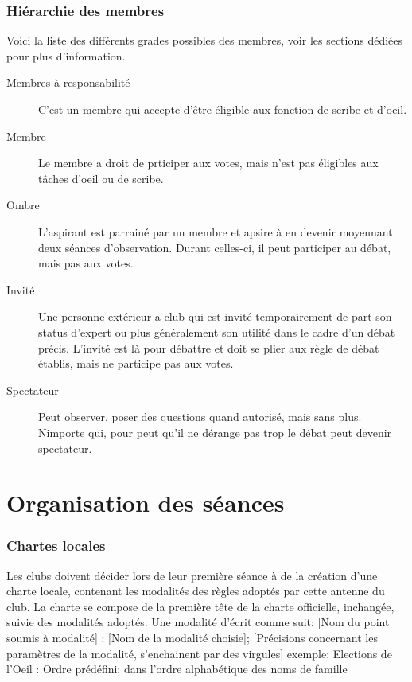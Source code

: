 \documentclass[a4paper,12pt]{article}
\begin{document}
\section{Hiérarchie des membres}
Voici la liste des différents grades possibles des membres, voir les sections dédiées pour plus d'information.
\begin{description}
 \item[Membres à responsabilité] C'est un membre qui accepte d'être éligible aux fonction de scribe et d'oeil.
 \item[Membre] Le membre a droit de prticiper aux votes, mais n'est pas éligibles aux tâches d'oeil ou de scribe.
 \item[Ombre] L'aspirant est parrainé par un membre et apsire à en devenir moyennant deux séances d'observation. Durant celles-ci, il peut participer au débat, mais pas aux votes.
 \item[Invité] Une personne extérieur a club qui est invité temporairement de part son status d'expert ou plus généralement son utilité dans le cadre d'un débat précis. L'invité est là pour débattre et doit se plier aux règle de débat établis, mais ne participe pas aux votes.
 \item[Spectateur] Peut observer, poser des questions quand autorisé, mais sans plus. Nimporte qui, pour peut qu'il ne dérange pas trop le débat peut devenir spectateur.
\end{description}


\newpage
\part{Organisation des séances}

\section{Chartes locales}
Les clubs doivent décider lors de leur première séance à de la création d'une charte locale, contenant les modalités des règles adoptés par cette antenne du club. La charte se compose de la première tête de la charte officielle, inchangée, suivie des modalités adoptés. Une modalité d'écrit comme suit:
[Nom du point soumis à modalité] : [Nom de la modalité choisie]; [Précisions concernant les paramètres de la modalité, s'enchainent par des virgules]
exemple: Elections de l'Oeil : Ordre prédéfini; dans l'ordre alphabétique des noms de famille
\end{document}
